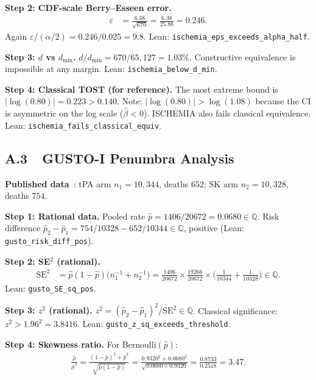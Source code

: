 \documentclass[11pt,a4paper]{article}
\theoremstyle{plain}
\theoremstyle{definition}
\newcommand{\Q}{\mathbb{Q}}
\begin{document}
\smallskip\noindent\textbf{Step 2: CDF-scale Berry--Esseen error.}
\begin{align*}
  \varepsilon &= \frac{6.38}{\sqrt{670}} = \frac{6.38}{25.88} = 0.246.
\end{align*}
Again $\varepsilon/(\alpha/2) = 0.246/0.025 = 9.8$.  Lean: \texttt{ischemia\_eps\_exceeds\_alpha\_half}.

\smallskip\noindent\textbf{Step 3: $d$ vs $d_{\min}$.}  $d/d_{\min} = 670/65{,}127 = 1.03\%$.  Constructive equivalence is impossible at any margin.  Lean: \texttt{ischemia\_below\_d\_min}.

\smallskip\noindent\textbf{Step 4: Classical TOST (for reference).}  The most extreme bound is $|\log(0.80)| = 0.223 > 0.140$.  Note: $|\log(0.80)| > \log(1.08)$ because the CI is asymmetric on the log scale ($\hat\beta < 0$).  ISCHEMIA also fails classical equivalence.  Lean: \texttt{ischemia\_fails\_classical\_equiv}.

\subsection*{A.3\ \ GUSTO-I Penumbra Analysis}

\noindent\textbf{Published data}~\cite{gusto}: tPA arm $n_1 = 10{,}344$, deaths $652$; SK arm $n_2 = 10{,}328$, deaths $754$.

\smallskip\noindent\textbf{Step 1: Rational data.}  Pooled rate $\hat p = 1406/20672 = 0.0680 \in \Q$.  Risk difference $\hat p_2 - \hat p_1 = 754/10328 - 652/10344 \in \Q$, positive (Lean: \texttt{gusto\_risk\_diff\_pos}).

\smallskip\noindent\textbf{Step 2: SE$^2$ (rational).}
\begin{align*}
  \mathrm{SE}^2 &= \hat p(1-\hat p)\bigl(n_1^{-1} + n_2^{-1}\bigr) = \frac{1406}{20672} \times \frac{19266}{20672} \times \biggl(\frac{1}{10344} + \frac{1}{10328}\biggr) \in \Q.
\end{align*}
Lean: \texttt{gusto\_SE\_sq\_pos}.

\smallskip\noindent\textbf{Step 3: $z^2$ (rational).}  $z^2 = (\hat p_2 - \hat p_1)^2/\mathrm{SE}^2 \in \Q$.  Classical significance: $z^2 > 1.96^2 = 3.8416$.  Lean: \texttt{gusto\_z\_sq\_exceeds\_threshold}.

\smallskip\noindent\textbf{Step 4: Skewness ratio.}  For Bernoulli$(\hat p)$:
\begin{align*}
  \frac{\hat\rho}{\hat\sigma^3} = \frac{(1-\hat p)^2 + \hat p^2}{\sqrt{\hat p(1-\hat p)}} = \frac{0.9320^2 + 0.0680^2}{\sqrt{0.0680 \times 0.9320}} = \frac{0.8733}{0.2518} = 3.47.
\end{align*}
\end{document}
